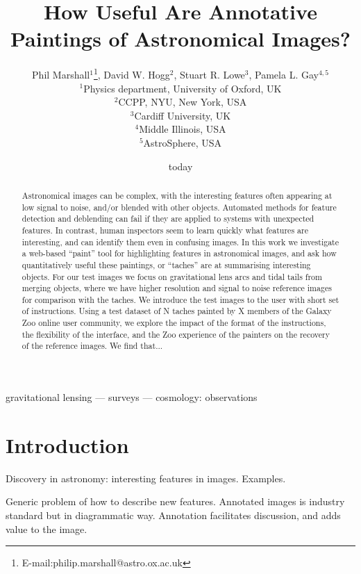 \documentclass[useAMS,usenatbib]{mn2e}
\title%
[Astronomical Image Annotation]%
{How Useful Are Annotative Paintings of Astronomical Images?}
\author%
[Marshall et al]%
{Phil Marshall$^{1}$\thanks{E-mail:philip.marshall@astro.ox.ac.uk}, 
David W. Hogg$^{2}$,
Stuart R. Lowe$^{3}$,
Pamela L. Gay$^{4,5}$\\
$^{1}$Physics department, University of Oxford, UK\\
$^{2}$CCPP, NYU, New York, USA\\
$^{3}$Cardiff University, UK\\
$^{4}$Middle Illinois, USA\\
$^{5}$AstroSphere, USA}
\date{today}
\begin{document}
\maketitle


\begin{abstract}

Astronomical images can be complex, with the interesting features often
appearing at low signal to noise, and/or blended with other objects. Automated
methods for feature detection and deblending can fail if they are applied to
systems with unexpected features. In contrast,  human inspectors seem to learn
quickly what features are interesting, and can identify them even in confusing
images. In this work we investigate a web-based ``paint'' tool for
highlighting features in astronomical images, and ask how quantitatively
useful these paintings, or ``taches'' are at summarising interesting objects.
For our test images we focus on gravitational lens arcs and tidal tails from
merging objects, where we have higher resolution and signal to noise reference
images for comparison with the taches. We introduce the test images to the
user with short set of instructions. Using a test dataset of N taches painted
by X members of the Galaxy Zoo online user community, we explore the impact of
the format of the instructions, the flexibility of the interface, and the
Zoo experience of the painters on the recovery of the reference images. We
find that...

\end{abstract}


\begin{keywords}
gravitational lensing --- surveys --- cosmology: observations
\end{keywords}



\section{Introduction}

Discovery in astronomy: interesting features in images. Examples.

Generic problem of how to describe new features. Annotated images is industry
standard but in diagrammatic way. Annotation facilitates discussion, and adds
value to the image. 
\end{document}
